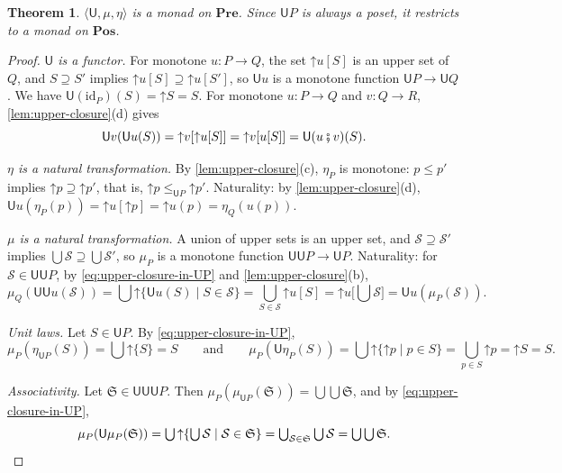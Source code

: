 \documentclass[11pt,a4paper]{article}
\theoremstyle{plain}
\newtheorem{theorem}{Theorem}[section]
\theoremstyle{definition}
\theoremstyle{remark}
\newcommand{\Cat}[1]{\mathbf{#1}}
\newcommand{\Pre}{\Cat{Pre}}
\newcommand{\Pos}{\Cat{Pos}}
\newcommand{\U}{\mathsf{U}}
\newcommand{\then}{\mathbin{\fatsemi}}
\newcommand{\tup}[1]{\langle #1 \rangle}
\newcommand{\up}{\mathord{\uparrow}}
\newcommand{\id}{\mathrm{id}}
\begin{document}
\begin{theorem}
    \label{thm:U-monad}
    $\tup{\U, \mu, \eta}$ is a monad on $\Pre$.
    Since $\U P$ is always a poset, it restricts to a monad on $\Pos$.
\end{theorem}
\begin{proof}
    \emph{$\U$ is a functor.}
    For monotone $u \colon P \to Q$, the set $\up u[S]$ is an upper set of $Q$, and $S \supseteq S'$ implies $\up u[S] \supseteq \up u[S']$, so $\U u$ is a monotone function $\U P \to \U Q$.
    We have $\U(\id_P)(S) = \up S = S$.
    For monotone $u \colon P \to Q$ and $v \colon Q \to R$, \cref{lem:upper-closure}(d) gives
    \begin{equation*}
        \U v(\U u(S)) = \up v[\up u[S]] = \up v[u[S]] = \U(u \then v)(S).
    \end{equation*}

    \emph{$\eta$ is a natural transformation.}
    By \cref{lem:upper-closure}(c), $\eta_P$ is monotone: $p \leq p'$ implies $\up p \supseteq \up p'$, that is, $\up p \leq_{\U P} \up p'$.
    Naturality: by \cref{lem:upper-closure}(d), $\U u(\eta_P(p)) = \up u[\up p] = \up u(p) = \eta_Q(u(p))$.

    \emph{$\mu$ is a natural transformation.}
    A union of upper sets is an upper set, and $\mathcal{S} \supseteq \mathcal{S}'$ implies $\bigcup \mathcal{S} \supseteq \bigcup \mathcal{S}'$, so $\mu_P$ is a monotone function $\U\U P \to \U P$.
    Naturality: for $\mathcal{S} \in \U\U P$, by \cref{eq:upper-closure-in-UP} and \cref{lem:upper-closure}(b),
    \begin{equation*}
        \mu_Q(\U\U u(\mathcal{S}))
        = \textstyle\bigcup \up \{ \U u(S) \mid S \in \mathcal{S} \}
        = \bigcup_{S \in \mathcal{S}} \up u[S]
        = \up u\bigl[\bigcup \mathcal{S}\bigr]
        = \U u(\mu_P(\mathcal{S})).
    \end{equation*}

    \emph{Unit laws.}
    Let $S \in \U P$.
    By \cref{eq:upper-closure-in-UP},
    \begin{equation*}
        \mu_P(\eta_{\U P}(S)) = \textstyle\bigcup \up \{S\} = S
        \qquad \text{and} \qquad
        \mu_P(\U\eta_P(S)) = \textstyle\bigcup \up \{ \up p \mid p \in S \} = \bigcup_{p \in S} \up p = \up S = S.
    \end{equation*}

    \emph{Associativity.}
    Let $\mathfrak{S} \in \U\U\U P$.
    Then $\mu_P(\mu_{\U P}(\mathfrak{S})) = \bigcup \bigcup \mathfrak{S}$, and by \cref{eq:upper-closure-in-UP},
    \begin{equation*}
        \mu_P(\U\mu_P(\mathfrak{S}))
        = \textstyle\bigcup \up \{ \bigcup \mathcal{S} \mid \mathcal{S} \in \mathfrak{S} \}
        = \bigcup_{\mathcal{S} \in \mathfrak{S}} \bigcup \mathcal{S}
        = \bigcup \bigcup \mathfrak{S}. \qedhere
    \end{equation*}
\end{proof}
\end{document}
